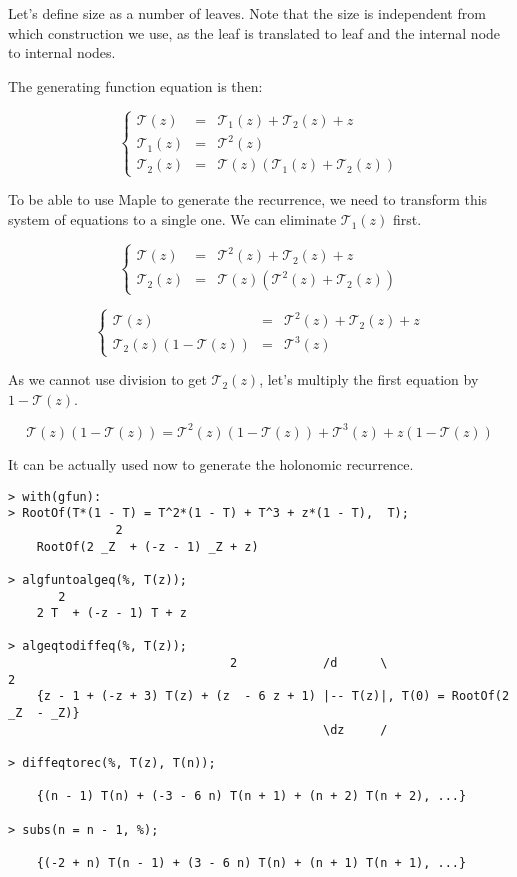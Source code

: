 \documentclass[final]{article}
\theoremstyle{definition}
\theoremstyle{definition}
\theoremstyle{remark}
\newcommand{\gf}[1]{\ensuremath{\mathcal{#1}}}
\begin{document}
Let's define size as a number of leaves. Note that the size is independent from which construction we use, as the leaf is translated to leaf and the internal node to internal nodes.

The generating function equation is then:

\[\left\{\begin{array}{rcl}
            \gf{T}(z) &=& \gf{T}_1(z) + \gf{T}_2(z) + z\\
            \gf{T}_1(z) &=& \gf{T}^2(z)\\
            \gf{T}_2(z) &=& \gf{T}(z)(\gf{T}_1(z) + \gf{T}_2(z))
\end{array}\right.\]

To be able to use Maple to generate the recurrence, we need to transform this system of equations to a single one. We can eliminate \(\gf{T}_1(z)\) first.

\[\left\{\begin{array}{rcl}
            \gf{T}(z) &=& \gf{T}^2(z) + \gf{T}_2(z) + z\\
            \gf{T}_2(z) &=& \gf{T}(z)(\gf{T}^2(z) + \gf{T}_2(z))
\end{array}\right.\]

\[\left\{\begin{array}{rcl}
            \gf{T}(z) &=& \gf{T}^2(z) + \gf{T}_2(z) + z\\
            \gf{T}_2(z)(1 - \gf{T}(z)) &=& \gf{T}^3(z)
\end{array}\right.\]

As we cannot use division to get \(\gf{T}_2(z)\), let's multiply the first equation by \(1 - \gf{T}(z)\).

\[\gf{T}(z)(1 - \gf{T}(z)) = \gf{T}^2(z)(1 - \gf{T}(z)) + \gf{T}^3(z) + z(1 - \gf{T}(z))\]

It can be actually used now to generate the holonomic recurrence.

\begin{lstlisting}
> with(gfun):
> RootOf(T*(1 - T) = T^2*(1 - T) + T^3 + z*(1 - T),  T);
               2
    RootOf(2 _Z  + (-z - 1) _Z + z)

> algfuntoalgeq(%, T(z));
       2
    2 T  + (-z - 1) T + z

> algeqtodiffeq(%, T(z));
                               2            /d      \                    2
    {z - 1 + (-z + 3) T(z) + (z  - 6 z + 1) |-- T(z)|, T(0) = RootOf(2 _Z  - _Z)}
                                            \dz     /

> diffeqtorec(%, T(z), T(n));

    {(n - 1) T(n) + (-3 - 6 n) T(n + 1) + (n + 2) T(n + 2), ...}

> subs(n = n - 1, %);

    {(-2 + n) T(n - 1) + (3 - 6 n) T(n) + (n + 1) T(n + 1), ...}
\end{lstlisting}
\end{document}
